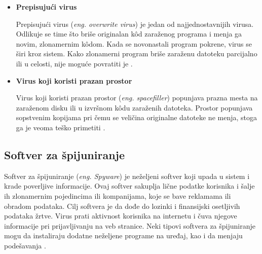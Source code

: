 \documentclass[a4paper]{article}
\begin{document}
\begin{itemize}
\item \textbf{Prepisujući virus}

Prepisujući virus (\textit{eng. overwrite virus}) je jedan od najjednostavnijih virusa. Odlikuje se time što briše originalan kôd zaraženog programa i menja ga novim, zlonamernim kôdom. Kada se novonastali program pokrene, virus se širi kroz sistem. Kako zlonamerni program briše zaraženu datoteku parcijalno ili u celosti, nije moguće povratiti je \cite{overwriting_virus}.

\item \textbf{Virus koji koristi prazan prostor}

Virus koji koristi prazan prostor (\textit{eng. spacefiller}) popunjava prazna mesta na zaraženom disku ili u izvršnom kôdu zaraženih datoteka. Prostor popunjava sopstvenim kopijama pri čemu se veličina originalne datoteke ne menja, stoga ga je veoma teško primetiti \cite{spacefiller_virus}.

\end{itemize}


\subsection{Softver za špijuniranje}
\label{spyware}
Softver za špijuniranje (\textit{eng. Spyware}) je neželjeni softver koji upada u sistem i krade poverljive informacije. Ovaj softver sakuplja lične podatke korisnika i šalje ih zlonamernim pojedincima ili kompanijama, koje se bave reklamama ili obradom podataka. Cilj softvera je da dođe do lozinki i finansijski osetljivih podataka žrtve. Virus prati aktivnost korisnika na internetu i čuva njegove informacije pri prijavljivanju na veb stranice. Neki tipovi softvera za špijuniranje mogu da instaliraju dodatne neželjene programe na uređaj, kao i da menjaju podešavanja \cite{spyware}.
\end{document}
